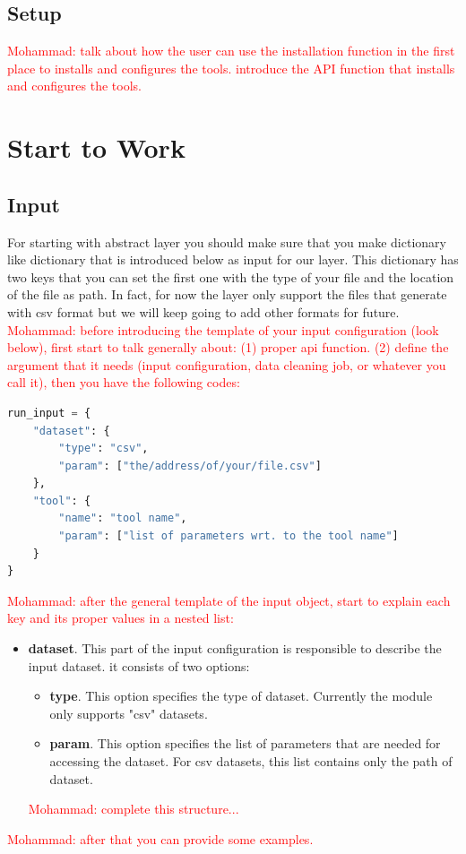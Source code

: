 \documentclass[12pt]{article}
\newcommand{\mohammad}[1]{\textcolor{red}{Mohammad: #1}}
\begin{document}
\subsection{Setup}
\mohammad{talk about how the user can use the installation function in the first place to installs and configures the tools. introduce the API function that installs and configures the tools.}


\section{Start to Work}

\subsection{Input}
For starting with abstract layer you should make sure that you make dictionary like dictionary that is introduced below as input for our layer.
This dictionary has two keys that you can set the first one with the type of your file and the location of the file as path. In fact, for now the layer only support the files that generate with csv format but we will keep going to add other formats for future. 
\mohammad{before introducing the template of your input configuration (look below), first start to talk generally about: (1) proper api function. (2) define the argument that it needs (input configuration, data cleaning job, or whatever you call it), then you have the following codes:}
\begin{lstlisting}[language=Python]
run_input = {
	"dataset": {
		"type": "csv",
		"param": ["the/address/of/your/file.csv"]
	},
	"tool": {
		"name": "tool name",
		"param": ["list of parameters wrt. to the tool name"]
	}
}
\end{lstlisting}
\mohammad{after the general template of the input object, start to explain each key and its proper values in a nested list:}
\begin{itemize}
	\item \textbf{dataset}. This part of the input configuration is responsible to describe the input dataset. it consists of two options:
	\begin{itemize}
		\item \textbf{type}. This option specifies the type of dataset. Currently the module only supports "csv" datasets.
		\item \textbf{param}. This option specifies the list of parameters that are needed for accessing the dataset. For csv datasets, this list contains only the path of dataset.
	\end{itemize}
	\mohammad{complete this structure...}
\end{itemize}
\mohammad{after that you can provide some examples.}
\end{document}
